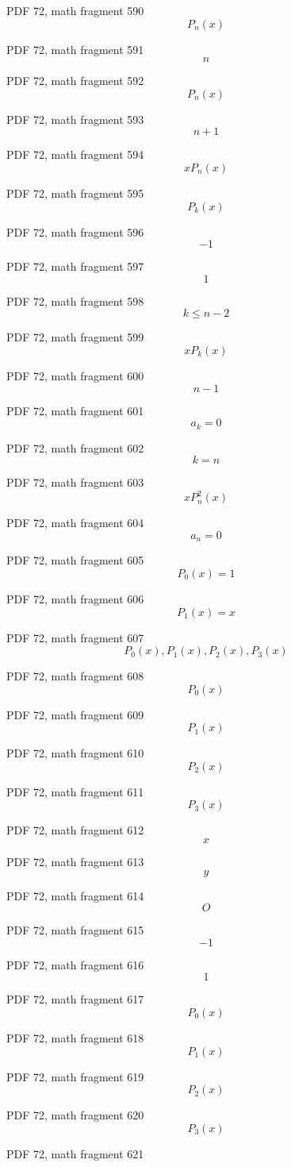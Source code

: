 \documentclass[UTF8,fontset=fandol]{ctexart}
\begin{document}
\par
PDF 72, math fragment 590
\[P_n(x)\]
\par
PDF 72, math fragment 591
\[n\]
\par
PDF 72, math fragment 592
\[P_n(x)\]
\par
PDF 72, math fragment 593
\[n+1\]
\par
PDF 72, math fragment 594
\[xP_n(x)\]
\par
PDF 72, math fragment 595
\[P_k(x)\]
\par
PDF 72, math fragment 596
\[-1\]
\par
PDF 72, math fragment 597
\[1\]
\par
PDF 72, math fragment 598
\[k \leqslant n-2\]
\par
PDF 72, math fragment 599
\[xP_k(x)\]
\par
PDF 72, math fragment 600
\[n-1\]
\par
PDF 72, math fragment 601
\[a_k = 0\]
\par
PDF 72, math fragment 602
\[k=n\]
\par
PDF 72, math fragment 603
\[xP_n^2(x)\]
\par
PDF 72, math fragment 604
\[a_n = 0\]
\par
PDF 72, math fragment 605
\[P_0(x)=1\]
\par
PDF 72, math fragment 606
\[P_1(x)=x\]
\par
PDF 72, math fragment 607
\[P_0(x), P_1(x), P_2(x), P_3(x)\]
\par
PDF 72, math fragment 608
\[P_0(x)\]
\par
PDF 72, math fragment 609
\[P_1(x)\]
\par
PDF 72, math fragment 610
\[P_2(x)\]
\par
PDF 72, math fragment 611
\[P_3(x)\]
\par
PDF 72, math fragment 612
\[x\]
\par
PDF 72, math fragment 613
\[y\]
\par
PDF 72, math fragment 614
\[O\]
\par
PDF 72, math fragment 615
\[-1\]
\par
PDF 72, math fragment 616
\[1\]
\par
PDF 72, math fragment 617
\[P_0(x)\]
\par
PDF 72, math fragment 618
\[P_1(x)\]
\par
PDF 72, math fragment 619
\[P_2(x)\]
\par
PDF 72, math fragment 620
\[P_3(x)\]
\par
PDF 72, math fragment 621
\end{document}
